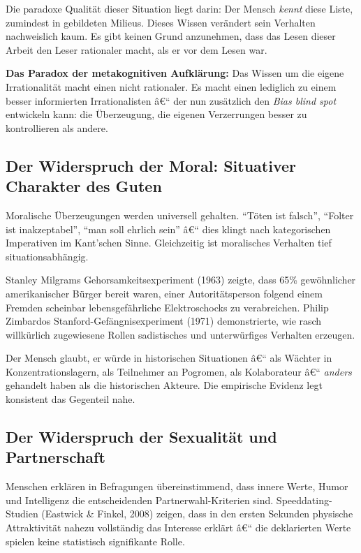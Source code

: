 ﻿\documentclass[12pt, a4paper]{article}
\begin{document}
Die paradoxe Qualität dieser Situation liegt darin: Der Mensch \emph{kennt} diese
Liste, zumindest in gebildeten Milieus. Dieses Wissen verändert sein Verhalten
nachweislich kaum. Es gibt keinen Grund anzunehmen, dass das Lesen dieser Arbeit
den Leser rationaler macht, als er vor dem Lesen war.

\begin{infobox}
\textbf{Das Paradox der metakognitiven Aufklärung:} Das Wissen um die eigene
Irrationalität macht einen nicht rationaler. Es macht einen lediglich zu einem
besser informierten Irrationalisten â€“ der nun zusätzlich den \emph{Bias blind spot}
entwickeln kann: die Überzeugung, die eigenen Verzerrungen besser zu kontrollieren
als andere.
\end{infobox}

\subsection{Der Widerspruch der Moral: Situativer Charakter des Guten}

Moralische Überzeugungen werden universell gehalten. \enquote{Töten ist falsch},
\enquote{Folter ist inakzeptabel}, \enquote{man soll ehrlich sein} â€“ dies klingt
nach kategorischen Imperativen im Kant'schen Sinne. Gleichzeitig ist moralisches
Verhalten tief situationsabhängig.

Stanley Milgrams Gehorsamkeitsexperiment (1963) zeigte, dass 65\% gewöhnlicher
amerikanischer Bürger bereit waren, einer Autoritätsperson folgend einem
Fremden scheinbar lebensgefährliche Elektroschocks zu verabreichen. Philip
Zimbardos Stanford-Gefängnisexperiment (1971) demonstrierte, wie rasch willkürlich
zugewiesene Rollen sadistisches und unterwürfiges Verhalten erzeugen.

Der Mensch glaubt, er würde in historischen Situationen â€“ als Wächter in
Konzentrationslagern, als Teilnehmer an Pogromen, als Kolaborateur â€“
\emph{anders} gehandelt haben als die historischen Akteure. Die empirische
Evidenz legt konsistent das Gegenteil nahe.

\subsection{Der Widerspruch der Sexualität und Partnerschaft}

Menschen erklären in Befragungen übereinstimmend, dass innere Werte,
Humor und Intelligenz die entscheidenden Partnerwahl-Kriterien sind.
Speeddating-Studien (Eastwick \& Finkel, 2008) zeigen, dass in den ersten
Sekunden physische Attraktivität nahezu vollständig das Interesse erklärt
â€“ die deklarierten Werte spielen keine statistisch signifikante Rolle.
\end{document}
